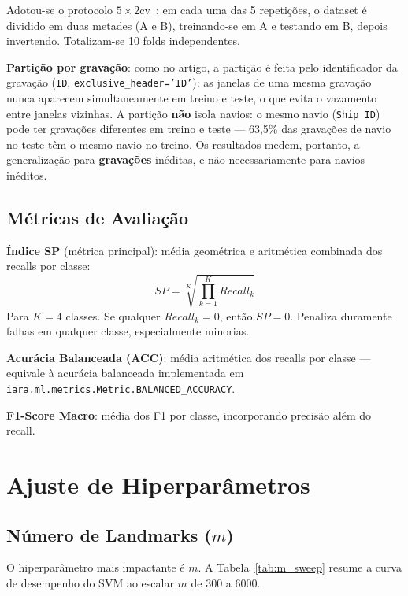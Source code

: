 \documentclass[a4paper,12pt]{article}
\begin{document}
Adotou-se o protocolo $5\times2$cv~\cite{alpaydin1999}: em cada uma das 5 repetições, o dataset é dividido em duas metades (A e B), treinando-se em A e testando em B, depois invertendo. Totalizam-se 10 folds independentes.

\textbf{Partição por gravação}: como no artigo, a partição é feita pelo identificador da gravação (\texttt{ID}, \texttt{exclusive\_header='ID'}): as janelas de uma mesma gravação nunca aparecem simultaneamente em treino e teste, o que evita o vazamento entre janelas vizinhas. A partição \textbf{não} isola navios: o mesmo navio (\texttt{Ship ID}) pode ter gravações diferentes em treino e teste --- 63,5\% das gravações de navio no teste têm o mesmo navio no treino. Os resultados medem, portanto, a generalização para \textbf{gravações} inéditas, e não necessariamente para navios inéditos.

\subsection{Métricas de Avaliação}

\textbf{Índice SP} (métrica principal): média geométrica e aritmética combinada dos recalls por classe:
\begin{equation}
    SP = \sqrt[K]{\prod_{k=1}^{K} Recall_k}
\end{equation}
Para $K=4$ classes. Se qualquer $Recall_k = 0$, então $SP = 0$. Penaliza duramente falhas em qualquer classe, especialmente minorias.

\textbf{Acurácia Balanceada (ACC)}: média aritmética dos recalls por classe — equivale à acurácia balanceada implementada em \texttt{iara.ml.metrics.Metric.BALANCED\_ACCURACY}.

\textbf{F1-Score Macro}: média dos F1 por classe, incorporando precisão além do recall.

\section{Ajuste de Hiperparâmetros}

\subsection{Número de Landmarks ($m$)}

O hiperparâmetro mais impactante é $m$. A Tabela~\ref{tab:m_sweep} resume a curva de desempenho do SVM ao escalar $m$ de 300 a 6000.
\end{document}
